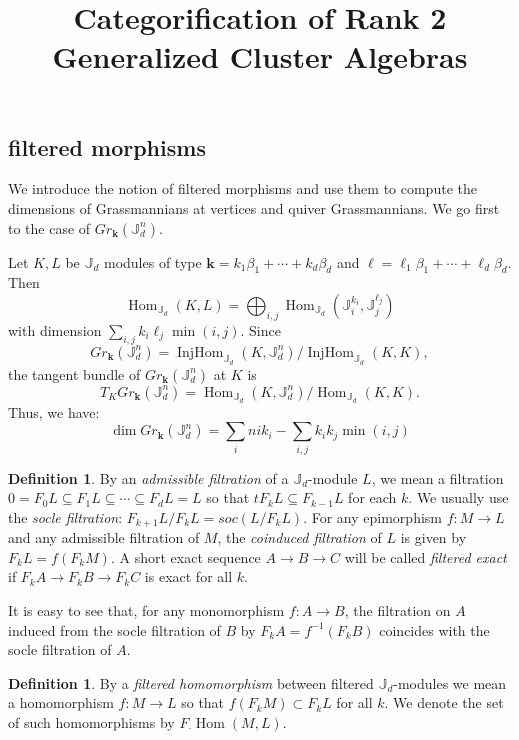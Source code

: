 \documentclass{amsart}
\title{Categorification of Rank 2 Generalized Cluster Algebras}
\numberwithin{equation}{section}
\theoremstyle{definition}
\newtheorem{definition}[theorem]{Definition}
\def\JJ{\mathbb{J}}
\def\bfk{\mathbf{k}}
\def\dim{\operatorname{dim}}
\def\Hom{\operatorname{Hom}}
\def\IHom{\operatorname{InjHom}}
\begin{document}


\subsection{filtered morphisms}

We introduce the notion of filtered morphisms and use them to compute the dimensions of Grassmannians at vertices and quiver Grassmannians. We go first to the case of $Gr_\bfk(\JJ_d^n)$.

Let $K,L$ be $\JJ_d$ modules of type $\bfk=k_1\beta_1+\cdots+k_d\beta_d$ and $\ell=\ell_1\beta_1+\cdots+\ell_d\beta_d$. Then 
\[
\Hom_{\JJ_d}(K,L)=\bigoplus_{i,j}\Hom_{\JJ_d}(\JJ_i^{k_i},\JJ_j^{\ell_j})
\]
with dimension $\sum_{i,j} k_i\ell_j\min(i,j)$. Since
\[
	Gr_\bfk(\JJ_d^n)=\IHom_{\JJ_d}(K,\JJ_d^n)/\IHom_{\JJ_d}(K,K),
\]
the tangent bundle of $Gr_\bfk(\JJ_d^n)$ at $K$ is 
\[
T_KGr_\bfk(\JJ_d^n)=\Hom_{\JJ_d}(K,\JJ_d^n)/\Hom_{\JJ_d}(K,K).
\]
Thus, we have:
\[
	\dim Gr_\bfk(\JJ_d^n)=\sum_i nik_i -\sum_{i,j}k_ik_j\min(i,j)
\]

\begin{definition}
By an \emph{admissible filtration} of a $\JJ_d$-module $L$, we mean a filtration $0=F_0L\subseteq F_1L\subseteq \cdots\subseteq F_dL=L$ so that $tF_kL\subseteq F_{k-1}L$ for each $k$. We usually use the \emph{socle filtration}: $F_{k+1}L/F_{k}L=soc (L/F_{k}L)$. For any epimorphism $f:M\to L$ and any admissible filtration of $M$, the \emph{coinduced filtration} of $L$ is given by $F_kL=f(F_kM)$. A short exact sequence $A\to B\to C$ will be called \emph{filtered exact} if $F_kA\to F_kB\to F_kC$ is exact for all $k$.
\end{definition}

It is easy to see that, for any monomorphism $f:A\to B$, the filtration on $A$ induced from the socle filtration of $B$ by $F_kA=f^{-1}(F_kB)$ coincides with the socle filtration of $A$.

\begin{definition}
By a \emph{filtered homomorphism} between filtered $\JJ_d$-modules we mean a homomorphism $f:M\to L$ so that $f(F_kM)\subset F_kL$ for all $k$. We denote the set of such homomorphisms by $F_\cdot \Hom(M,L)$.
\end{definition}
\end{document}
